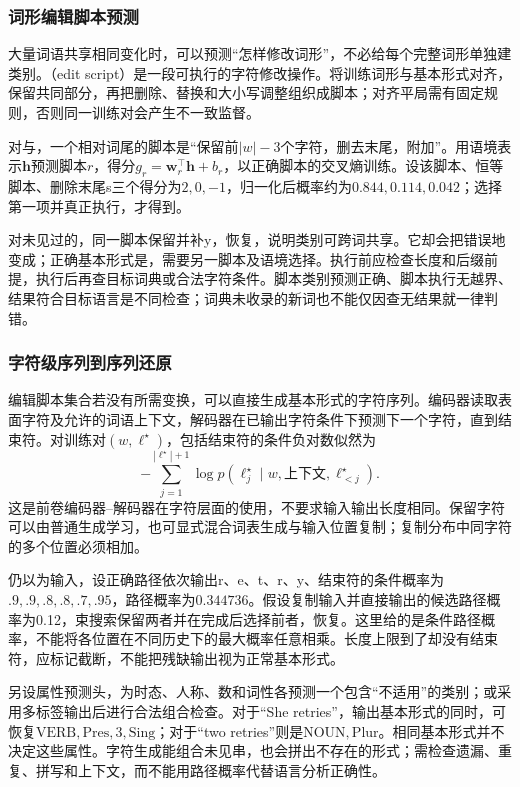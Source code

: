\subsubsection{词形编辑脚本预测}
\label{sec:nlp-analysis-edit-lemma}

大量词语共享相同变化时，可以预测“怎样修改词形”，不必给每个完整词形单独建类别。（edit script）是一段可执行的字符修改操作。将训练词形与基本形式对齐，保留共同部分，再把删除、替换和大小写调整组织成脚本；对齐平局需有固定规则，否则同一训练对会产生不一致监督。

对与，一个相对词尾的脚本是“保留前$|w|-3$个字符，删去末尾，附加”。用语境表示$\bm h$预测脚本$r$，得分$g_r=\bm w_r^\top\bm h+b_r$，以正确脚本的交叉熵训练。设该脚本、恒等脚本、删除末尾s三个得分为$2,0,-1$，归一化后概率约为$0.844,0.114,0.042$；选择第一项并真正执行，才得到。

对未见过的，同一脚本保留并补y，恢复，说明类别可跨词共享。它却会把错误地变成；正确基本形式是，需要另一脚本及语境选择。执行前应检查长度和后缀前提，执行后再查目标词典或合法字符条件。脚本类别预测正确、脚本执行无越界、结果符合目标语言是不同检查；词典未收录的新词也不能仅因查无结果就一律判错。

\subsubsection{字符级序列到序列还原}
\label{sec:nlp-analysis-seq2seq-lemma}

编辑脚本集合若没有所需变换，可以直接生成基本形式的字符序列。编码器读取表面字符及允许的词语上下文，解码器在已输出字符条件下预测下一个字符，直到结束符。对训练对$(w,\ell^\star)$，包括结束符的条件负对数似然为
\[
  -\sum_{j=1}^{|\ell^\star|+1}
  \log p(\ell_j^\star\mid w,\text{上下文},\ell^\star_{<j}).
\]
这是前卷编码器--解码器在字符层面的使用，不要求输入输出长度相同。保留字符可以由普通生成学习，也可显式混合词表生成与输入位置复制；复制分布中同字符的多个位置必须相加。

仍以为输入，设正确路径依次输出r、e、t、r、y、结束符的条件概率为$.9,.9,.8,.8,.7,.95$，路径概率为$0.344736$。假设复制输入并直接输出的候选路径概率为0.12，束搜索保留两者并在完成后选择前者，恢复。这里给的是条件路径概率，不能将各位置在不同历史下的最大概率任意相乘。长度上限到了却没有结束符，应标记截断，不能把残缺输出视为正常基本形式。

另设属性预测头，为时态、人称、数和词性各预测一个包含“不适用”的类别；或采用多标签输出后进行合法组合检查。对于“She retries”，输出基本形式的同时，可恢复$\mathrm{VERB,Pres,3,Sing}$；对于“two retries”则是$\mathrm{NOUN,Plur}$。相同基本形式并不决定这些属性。字符生成能组合未见串，也会拼出不存在的形式；需检查遗漏、重复、拼写和上下文，而不能用路径概率代替语言分析正确性。

